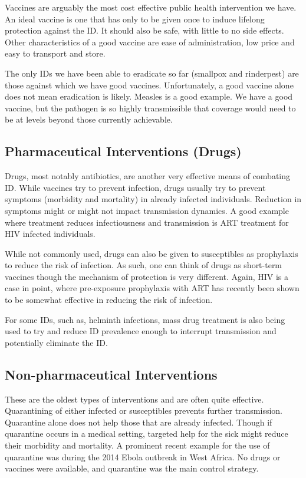 \documentclass[
]{book}
\begin{document}
Vaccines are arguably the most cost effective public health intervention we have. An ideal vaccine is one that has only to be given once to induce lifelong protection against the ID. It should also be safe, with little to no side effects. Other characteristics of a good vaccine are ease of administration, low price and easy to transport and store.

The only IDs we have been able to eradicate so far (smallpox and rinderpest) are those against which we have good vaccines. Unfortunately, a good vaccine alone does not mean eradication is likely. Measles is a good example. We have a good vaccine, but the pathogen is so highly transmissible that coverage would need to be at levels beyond those currently achievable.

\hypertarget{pharmaceutical-interventions-drugs}{%
\subsection{Pharmaceutical Interventions (Drugs)}\label{pharmaceutical-interventions-drugs}}

Drugs, most notably antibiotics, are another very effective means of combating ID. While vaccines try to prevent infection, drugs usually try to prevent symptoms (morbidity and mortality) in already infected individuals. Reduction in symptoms might or might not impact transmission dynamics. A good example where treatment reduces infectiousness and transmission is ART treatment for HIV infected individuals.

While not commonly used, drugs can also be given to susceptibles as prophylaxis to reduce the risk of infection. As such, one can think of drugs as short-term vaccines though the mechanism of protection is very different. Again, HIV is a case in point, where pre-exposure prophylaxis with ART has recently been shown to be somewhat effective in reducing the risk of infection.

For some IDs, such as, helminth infections, mass drug treatment is also being used to try and reduce ID prevalence enough to interrupt transmission and potentially eliminate the ID.

\hypertarget{non-pharmaceutical-interventions}{%
\subsection{Non-pharmaceutical Interventions}\label{non-pharmaceutical-interventions}}

These are the oldest types of interventions and are often quite effective. Quarantining of either infected or susceptibles prevents further transmission. Quarantine alone does not help those that are already infected. Though if quarantine occurs in a medical setting, targeted help for the sick might reduce their morbidity and mortality. A prominent recent example for the use of quarantine was during the 2014 Ebola outbreak in West Africa. No drugs or vaccines were available, and quarantine was the main control strategy.
\end{document}
